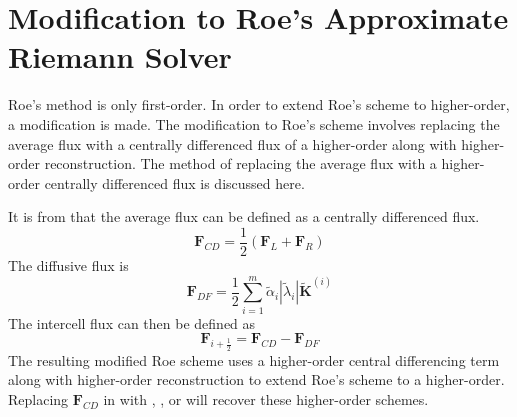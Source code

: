 \section{Modification to Roe's Approximate Riemann Solver}

Roe's method is only first-order. In order to extend Roe's scheme to higher-order, a modification is made. The modification to Roe's scheme involves replacing the average flux with a centrally differenced flux of a higher-order along with higher-order reconstruction. The method of replacing the average flux with a higher-order centrally differenced flux is discussed here.

It is from  that the average flux can be defined as a centrally differenced flux.
\begin{equation}\label{eqn:CDFlux}
	\boldsymbol{F}_{CD} = \frac{1}{2} \left( \boldsymbol{F}_L + \boldsymbol{F}_R \right)
\end{equation}
The diffusive flux is
\begin{equation}\label{eqn:DiffFlux}
	\boldsymbol{F}_{DF} = \frac{1}{2}\sum_{i = 1}^{m} \tilde{\alpha}_i  |\tilde{\lambda}_i |  \tilde{\boldsymbol{K}}^{\left(i\right)}
\end{equation}
The intercell flux can then be defined as
\begin{equation}\label{eq:splitterm}
	\boldsymbol{F}_{i+\frac{1}{2}} = \boldsymbol{F}_{CD} - \boldsymbol{F}_{DF}
\end{equation}
The resulting modified Roe scheme uses a higher-order central differencing term along with higher-order reconstruction to extend Roe's scheme to a higher-order. Replacing $\boldsymbol{F}_{CD}$ in  with , , or  will recover these higher-order schemes.
